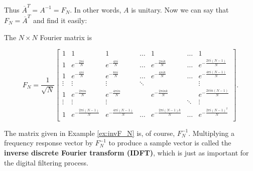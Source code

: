 Thus $\overline{A}^T = A^{-1} = F_N$. In other words, $A$ is unitary.\cite{Zhang} Now we can say that $F_N = \overline{A}^T$ and find it easily: 

\begin{definition}
    The $N\times N$ Fourier matrix is
    
    $$F_N = \frac{1}{\sqrt{N}} \begin{bmatrix}
        1 & 1 & 1 & \hdots & 1 & \hdots & 1\\
        1 & e^{-\frac{2\pi i}{N}} & e^{-\frac{4\pi i}{N}} & \hdots & e^{-\frac{2\pi ik}{N}} & \hdots & e^{-\frac{2\pi i(N-1)}{N}}\\
        1 & e^{-\frac{4\pi i}{N}} & e^{-\frac{8\pi i}{N}} & \hdots & e^{-\frac{4\pi ik}{N}} & \hdots & e^{-\frac{4\pi i(N-1)}{N}}\\
        \vdots & \vdots & \vdots & \ddots & & & \vdots\\
        1 & e^{-\frac{2\pi in}{N}} & e^{-\frac{4\pi in}{N}} & & e^{-\frac{2\pi ink}{N}} & & e^{-\frac{2\pi in(N-1)}{N}}\\
        \vdots & \vdots & \vdots & & & \ddots & \vdots\\
        1 & e^{-\frac{2\pi i(N-1)}{N}} & e^{-\frac{4\pi i(N-1)}{N}} & \hdots & e^{-\frac{2\pi i(N-1)k}{N}} & \hdots & e^{-\frac{2\pi i(N-1)^2}{N}}\\
    \end{bmatrix}.$$
    \label{defn:F_N}
\end{definition}

\par The matrix given in Example \ref{ex:invF_N} is, of course, $F^{-1}_N$. Multiplying a frequency response vector by $F^{-1}_N$ to produce a sample vector is called the \textbf{inverse discrete Fourier transform (IDFT)}, which is just as important for the digital filtering process.